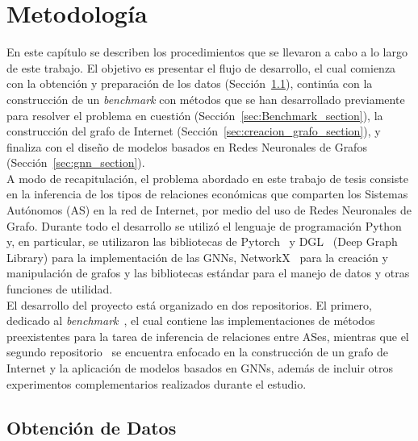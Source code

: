 \chapter{Metodología}

En este capítulo se describen los procedimientos que se llevaron a cabo a lo largo de este trabajo. El objetivo es presentar el flujo de desarrollo, el cual comienza con la obtención y preparación de los datos (Sección~\ref{sec:obtencion_datos_section}), continúa con la construcción de un \textit{benchmark} con métodos que se han desarrollado previamente para resolver el problema en cuestión (Sección~\ref{sec:Benchmark_section}), la construcción del grafo de Internet (Sección~\ref{sec:creacion_grafo_section}), y finaliza con el diseño de modelos basados en Redes Neuronales de Grafos (Sección~\ref{sec:gnn_section}).\\

A modo de recapitulación, el problema abordado en este trabajo de tesis consiste en la inferencia de los tipos de relaciones económicas que comparten los Sistemas Autónomos (AS) en la red de Internet, por medio del uso de Redes Neuronales de Grafo. Durante todo el desarrollo se utilizó el lenguaje de programación Python y, en particular, se utilizaron las bibliotecas de Pytorch~\cite{Pytorch} y DGL~\cite{DGL} (Deep Graph Library) para la implementación de las GNNs, NetworkX~\cite{networkx} para la creación y manipulación de grafos y las bibliotecas estándar para el manejo de datos y otras funciones de utilidad.\\

El desarrollo del proyecto está organizado en dos repositorios. El primero, dedicado al \textit{benchmark}~\cite{BenchmarkCode}, el cual contiene las implementaciones de métodos preexistentes para la tarea de inferencia de relaciones entre ASes, mientras que el segundo repositorio~\cite{gnnCode} se encuentra enfocado en la construcción de un grafo de Internet y la aplicación de modelos basados en GNNs, además de incluir otros experimentos complementarios realizados durante el estudio.\\


\section{Obtención de Datos} \label{sec:obtencion_datos_section}


